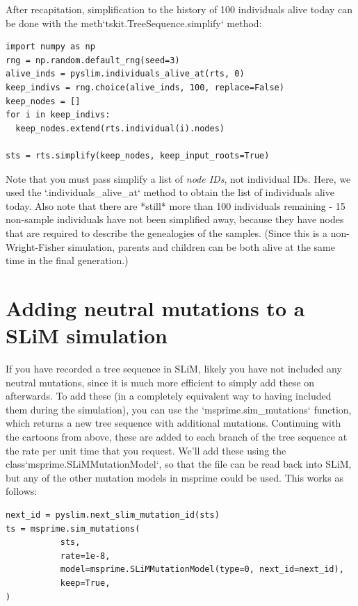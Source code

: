 \documentclass[12pt]{article}
\begin{document}
After recapitation,
simplification to the history of 100 individuals alive today
can be done with the {meth}`tskit.TreeSequence.simplify` method:
\begin{verbatim}
import numpy as np
rng = np.random.default_rng(seed=3)
alive_inds = pyslim.individuals_alive_at(rts, 0)
keep_indivs = rng.choice(alive_inds, 100, replace=False)
keep_nodes = []
for i in keep_indivs:
  keep_nodes.extend(rts.individual(i).nodes)

sts = rts.simplify(keep_nodes, keep_input_roots=True)
\end{verbatim}

Note that you must pass simplify a list of \textit{node IDs}, not individual IDs.
Here, we used the `.individuals\_alive\_at` method to obtain the list
of individuals alive today.
Also note that there are *still* more than 100 individuals remaining - 15 non-sample individuals
have not been simplified away,
because they have nodes that are required to describe the genealogies of the samples.
(Since this is a non-Wright-Fisher simulation,
parents and children can be both alive at the same time in the final generation.)



\section{Adding neutral mutations to a SLiM simulation}


If you have recorded a tree sequence in SLiM, likely you have not included any neutral mutations,
since it is much more efficient to simply add these on afterwards.
To add these (in a completely equivalent way to having included them during the simulation),
you can use the `msprime.sim\_mutations` function, which returns a new tree sequence with additional mutations.
Continuing with the cartoons from above, these are added to each branch of the tree sequence
at the rate per unit time that you request.
We'll add these using the {class}`msprime.SLiMMutationModel`, so that the file can be read back into SLiM,
but any of the other mutation models in msprime could be used.
This works as follows:
\begin{verbatim}
next_id = pyslim.next_slim_mutation_id(sts)
ts = msprime.sim_mutations(
           sts,
           rate=1e-8,
           model=msprime.SLiMMutationModel(type=0, next_id=next_id),
           keep=True,
)
\end{verbatim}
\end{document}
